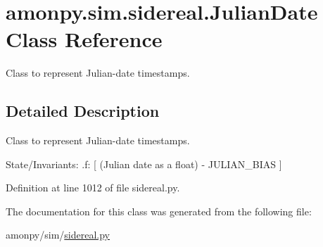 \hypertarget{classamonpy_1_1sim_1_1sidereal_1_1_julian_date}{\section{amonpy.\-sim.\-sidereal.\-Julian\-Date Class Reference}
\label{classamonpy_1_1sim_1_1sidereal_1_1_julian_date}
}


Class to represent Julian-\/date timestamps.  




\subsection{Detailed Description}
Class to represent Julian-\/date timestamps. 

State/\-Invariants\-: .f\-: \mbox{[} (Julian date as a float) -\/ J\-U\-L\-I\-A\-N\-\_\-\-B\-I\-A\-S \mbox{]} 

Definition at line 1012 of file sidereal.\-py.



The documentation for this class was generated from the following file\-:\begin{DoxyCompactItemize}
\item 
amonpy/sim/\hyperlink{sidereal_8py}{sidereal.\-py}\end{DoxyCompactItemize}
